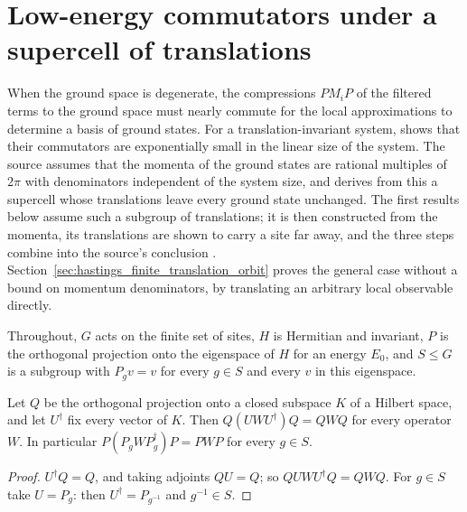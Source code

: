 \section{Low-energy commutators under a supercell of translations}
\label{sec:hastings_translation_supercell}


When the ground space is degenerate, the compressions $PM_iP$ of the filtered
terms to the ground space must nearly commute for the local approximations to
determine a basis of ground states. For a translation-invariant system,
\cite[lines 1603--1642]{Hastings2006Solving} shows that their commutators are
exponentially small in the linear size of the system. The source assumes that
the momenta of the ground states are rational multiples of $2\pi$ with
denominators independent of the system size, and derives from this a
supercell whose translations leave every ground state unchanged. The first
results below assume such a subgroup of translations; it is then constructed
from the momenta, its translations are shown to carry a site far away, and the
three steps combine into the source's conclusion
\cite{gap:hastings05_translation_supercell}. Section~\ref{sec:hastings_finite_translation_orbit}
proves the general case without a bound on momentum denominators, by translating
an arbitrary local observable directly.

Throughout, $G$ acts on the finite set of sites, $H$ is Hermitian and
invariant, $P$ is the orthogonal projection onto the eigenspace of $H$ for an
energy $E_0$, and $S\le G$ is a subgroup with $P_gv=v$ for every $g\in S$ and
every $v$ in this eigenspace.

\begin{lemma}
    \label{thm:hastings_supercell_compression}
    \leanok
    Let $Q$ be the orthogonal projection onto a closed subspace $K$ of a Hilbert
    space, and let $U^\dagger$ fix every vector of $K$. Then
    $Q(UWU^\dagger)Q=QWQ$ for every operator $W$. In particular
    $P(P_gWP_g^\dagger)P=PWP$ for every $g\in S$.
\end{lemma}
\begin{proof}\leanok
    $U^\dagger Q=Q$, and taking adjoints $QU=Q$; so
    $QUWU^\dagger Q=QWQ$. For $g\in S$ take $U=P_g$: then
    $U^\dagger=P_{g^{-1}}$ and $g^{-1}\in S$.
\end{proof}

